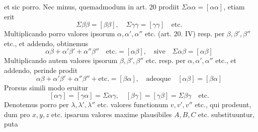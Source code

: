 et sic porro. Nec minus, quemadmodum in art. 20 prodiit \(\Sigma\alpha\alpha=[\alpha\alpha]\), etiam erit
\[
\Sigma\beta\beta=[\beta\beta],\quad\Sigma\gamma\gamma=[\gamma\gamma]\quad\text{etc.}
\]
Multiplicando porro valores ipsorum \(\alpha,\alpha',\alpha''\) etc. (art. 20. IV) resp. per \(\beta,\beta',\beta''\) etc., et addendo, obtinemus
\[
\alpha\beta+\alpha'\beta'+\alpha''\beta''\quad\text{etc.}=[\alpha\beta],\quad\text{sive}\quad\Sigma\alpha\beta=[\alpha\beta]
\]
Multiplicando autem valores ipsorum \(\beta,\beta',\beta''\) etc. resp. per \(\alpha,\alpha',\alpha''\) etc., et addendo, perinde prodit
\[
\alpha\beta+\alpha'\beta'+\alpha''\beta''+\text{etc.}=[\beta\alpha],\quad\text{adeoque}\quad[\alpha\beta]=[\beta\alpha]
\]
Prorsus simili modo eruitur
\[
[\alpha\gamma]=[\gamma\alpha]=\Sigma\alpha\gamma,\quad[\beta\gamma]=[\gamma\beta]=\Sigma\beta\gamma\quad\text{etc.}
\]
Denotemus porro per \(\lambda,\lambda',\lambda''\) etc. valores functionum \(v,v',v''\) etc., qui prodeunt, dum pro \(x,y,z\) etc. ipsarum valores maxime plausibiles \(A,B,C\) etc. substituuntur, puta
